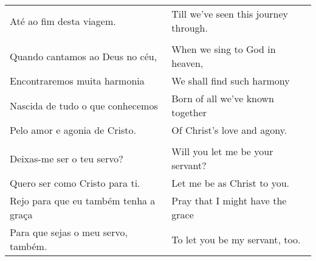 \begin{longtable}{p{2.1in}p{2in}}
Até ao fim desta viagem. & Till we've seen this journey through.\\
\\
Quando cantamos ao Deus no céu, & When we sing to God in heaven,\\
Encontraremos muita harmonia & We shall find such harmony\\
Nascida de tudo o que conhecemos & Born of all we've known together\\
Pelo amor e agonia de Cristo. & Of Christ's love and agony.\\
\\
Deixas-me ser o teu servo? & Will you let me be your servant?\\
Quero ser como Cristo para ti. & Let me be as Christ to you.\\
Rejo para que eu também tenha a graça & Pray that I might have the grace\\
Para que sejas o meu servo, também. & To let you be my servant, too.\\
\end{longtable}
